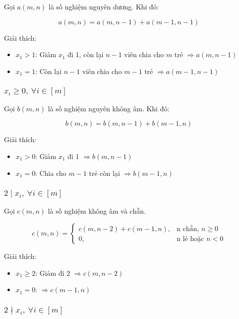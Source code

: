 \documentclass{article}
\begin{document}
	Gọi $a(m,n)$ là số nghiệm nguyên dương. Khi đó:
	
	\[
	a(m,n) = a(m,n-1) + a(m-1,n-1)
	\]
	
	Giải thích:
	\begin{itemize}
		\item $x_1 > 1$: Giảm $x_1$ đi 1, còn lại $n-1$ viên chia cho $m$ trẻ $\Rightarrow a(m,n-1)$
		\item $x_1 = 1$: Còn lại $n-1$ viên chia cho $m-1$ trẻ $\Rightarrow a(m-1,n-1)$
	\end{itemize}
	
	\subsubsection*{$x_i \ge 0,\ \forall i \in [m]$}
	
	Gọi $b(m,n)$ là số nghiệm nguyên không âm. Khi đó:
	
	\[
	b(m,n) = b(m,n-1) + b(m-1,n)
	\]
	
	Giải thích:
	\begin{itemize}
		\item $x_1 > 0$: Giảm $x_1$ đi 1 $\Rightarrow b(m,n-1)$
		\item $x_1 = 0$: Chia cho $m-1$ trẻ còn lại $\Rightarrow b(m-1,n)$
	\end{itemize}
	
	\subsubsection*{$2 \mid x_i,\ \forall i \in [m]$}
	
	Gọi $c(m,n)$ là số nghiệm không âm và chẵn.
	
	\[
	c(m,n) =
	\begin{cases}
		c(m,n-2) + c(m-1,n), & \text{n chẵn, } n \ge 0 \\
		0, & \text{n lẻ hoặc } n < 0
	\end{cases}
	\]
	
	Giải thích:
	\begin{itemize}
		\item $x_1 \ge 2$: Giảm đi 2 $\Rightarrow c(m,n-2)$
		\item $x_1 = 0$: $\Rightarrow c(m-1,n)$
	\end{itemize}
	
	\subsubsection*{$2 \nmid x_i,\ \forall i \in [m]$}
	
\end{document}
